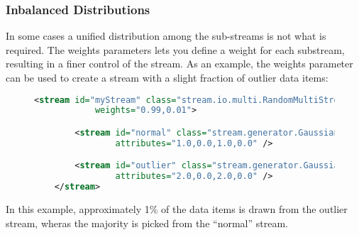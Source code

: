 \subsubsection{Inbalanced Distributions}
In some cases a unified distribution among the sub-streams is not what
is required. The {\ttfamily weights} parameters lets you define a
weight for each substream, resulting in a finer control of the
stream. As an example, the {\ttfamily weights} parameter can be used
to create a stream with a slight fraction of outlier data items:

\begin{figure}[h!]
  \centering
  \begin{lstlisting}[language=XML]
    <stream id="myStream" class="stream.io.multi.RandomMultiStream"
            weights="0.99,0.01">

        <stream id="normal" class="stream.generator.GaussianStream"
                attributes="1.0,0.0,1.0,0.0" />

        <stream id="outlier" class="stream.generator.GaussianStream"
                attributes="2.0,0.0,2.0,0.0" />
    </stream>
  \end{lstlisting}
\end{figure}
In this example, approximately 1\% of the data items is drawn from the
outlier stream, wheras the majority is picked from the ``normal''
stream.
